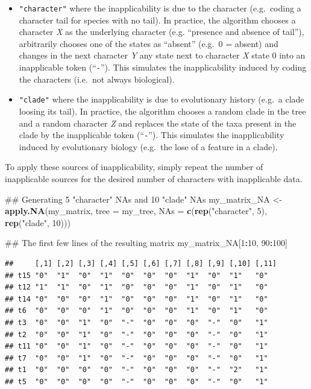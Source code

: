 \documentclass[]{book}
\newenvironment{Shaded}{\begin{snugshade}}{\end{snugshade}}
\newcommand{\KeywordTok}[1]{\textcolor[rgb]{0.13,0.29,0.53}{\textbf{#1}}}
\newcommand{\DataTypeTok}[1]{\textcolor[rgb]{0.13,0.29,0.53}{#1}}
\newcommand{\DecValTok}[1]{\textcolor[rgb]{0.00,0.00,0.81}{#1}}
\newcommand{\StringTok}[1]{\textcolor[rgb]{0.31,0.60,0.02}{#1}}
\newcommand{\OperatorTok}[1]{\textcolor[rgb]{0.81,0.36,0.00}{\textbf{#1}}}
\newcommand{\NormalTok}[1]{#1}
\providecommand{\tightlist}{%
  \setlength{\itemsep}{0pt}\setlength{\parskip}{0pt}}
\theoremstyle{definition}
\theoremstyle{definition}
\theoremstyle{remark}
\begin{document}
\begin{itemize}
\tightlist
\item
  \texttt{"character"} where the inapplicability is due to the character
  (e.g.~coding a character tail for species with no tail). In practice,
  the algorithm chooses a character \emph{X} as the underlying character
  (e.g. ``presence and absence of tail''), arbitrarily chooses one of
  the states as ``absent'' (e.g.~0 = absent) and changes in the next
  character \emph{Y} any state next to character \emph{X} state 0 into
  an inapplicable token (``\texttt{-}''). This simulates the
  inapplicability induced by coding the characters (i.e.~not always
  biological).
\item
  \texttt{"clade"} where the inapplicability is due to evolutionary
  history (e.g.~a clade loosing its tail). In practice, the algorithm
  chooses a random clade in the tree and a random character \emph{Z} and
  replaces the state of the taxa present in the clade by the
  inapplicable token (``\texttt{-}''). This simulates the
  inapplicability induced by evolutionary biology (e.g.~the lose of a
  feature in a clade).
\end{itemize}

To apply these sources of inapplicability, simply repeat the number of
inapplicable sources for the desired number of characters with
inapplicable data.

\begin{Shaded}
\begin{Highlighting}[]
\NormalTok{## Generating 5 "character" NAs and 10 "clade" NAs}
\NormalTok{my_matrix_NA <-}\StringTok{ }\KeywordTok{apply.NA}\NormalTok{(my_matrix, }\DataTypeTok{tree =}\NormalTok{ my_tree,}
                         \DataTypeTok{NAs =} \KeywordTok{c}\NormalTok{(}\KeywordTok{rep}\NormalTok{(}\StringTok{"character"}\NormalTok{, }\DecValTok{5}\NormalTok{), }\KeywordTok{rep}\NormalTok{(}\StringTok{"clade"}\NormalTok{, }\DecValTok{10}\NormalTok{)))}

\NormalTok{## The first few lines of the resulting matrix}
\NormalTok{my_matrix_NA[}\DecValTok{1}\OperatorTok{:}\DecValTok{10}\NormalTok{, }\DecValTok{90}\OperatorTok{:}\DecValTok{100}\NormalTok{]}
\end{Highlighting}
\end{Shaded}

\begin{verbatim}
##     [,1] [,2] [,3] [,4] [,5] [,6] [,7] [,8] [,9] [,10] [,11]
## t15 "0"  "1"  "0"  "1"  "0"  "0"  "0"  "1"  "0"  "1"   "0"  
## t12 "1"  "1"  "0"  "1"  "0"  "0"  "0"  "1"  "0"  "1"   "0"  
## t14 "0"  "0"  "0"  "1"  "0"  "0"  "0"  "1"  "0"  "1"   "0"  
## t6  "0"  "0"  "0"  "1"  "0"  "0"  "0"  "1"  "0"  "1"   "0"  
## t3  "0"  "0"  "1"  "0"  "-"  "0"  "0"  "0"  "-"  "0"   "1"  
## t2  "0"  "0"  "1"  "0"  "-"  "0"  "0"  "0"  "-"  "0"   "1"  
## t11 "0"  "0"  "1"  "0"  "-"  "0"  "0"  "0"  "-"  "0"   "1"  
## t7  "0"  "0"  "1"  "0"  "-"  "0"  "0"  "0"  "-"  "0"   "1"  
## t1  "0"  "0"  "0"  "0"  "-"  "0"  "0"  "0"  "-"  "2"   "1"  
## t5  "0"  "0"  "0"  "0"  "-"  "0"  "0"  "0"  "-"  "0"   "1"
\end{verbatim}
\end{document}
